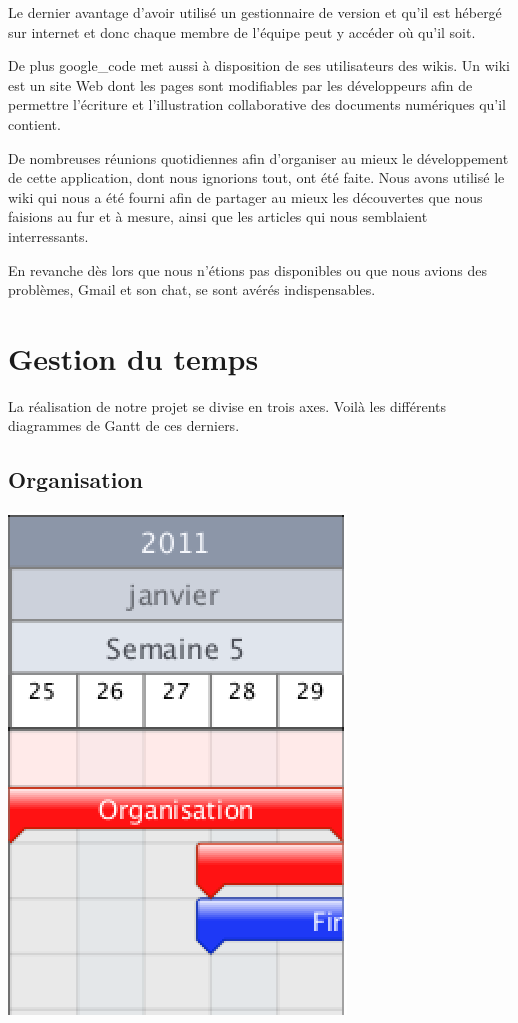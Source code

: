 	Le dernier avantage d'avoir utilisé un gestionnaire de version et qu'il est
	hébergé sur internet et donc chaque membre de l'équipe peut y accéder où qu'il
	soit. 
		
	De plus \gls{google_code} met aussi à disposition de ses utilisateurs des \glspl{wiki}.
	Un \gls{wiki} est un site Web dont les pages sont modifiables par les développeurs
	afin de permettre l'écriture et l'illustration collaborative des documents numériques qu'il contient.
	
	De nombreuses réunions quotidiennes afin d'organiser au mieux le développement
	de cette application, dont nous ignorions tout, ont été faite.
	Nous avons utilisé le \gls{wiki} qui nous a été fourni afin de partager au mieux les découvertes que nous faisions au fur
	et à mesure, ainsi que les articles qui nous semblaient interressants.
	
	En revanche dès lors que nous n'étions pas disponibles ou que nous avions des
	problèmes, Gmail et son chat, se sont avérés indispensables.
	

\section{Gestion du temps}
	La réalisation de notre projet se divise en trois axes. Voilà les différents diagrammes de Gantt de ces derniers.
	
	\subsection*{Organisation}
		\begin{center}
			\includegraphics{./Organisation/Img/BomberBlok-Organisation.eps}
		\end{center}
	
